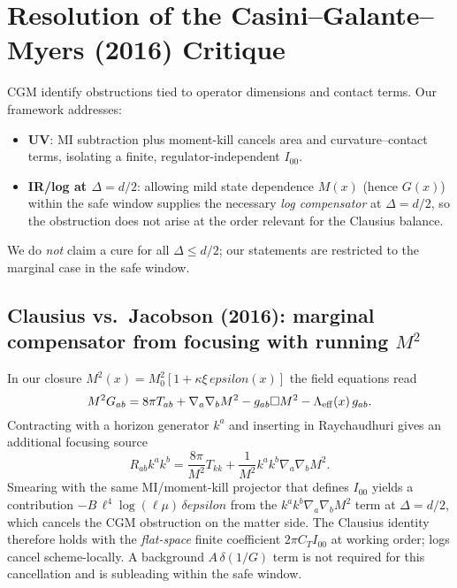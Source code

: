 \documentclass[aps,prd,onecolumn,superscriptaddress,nofootinbib]{revtex4-2}
\def\eps{epsilon}%
\newcommand{\eps}{\varepsilon}
\begin{document}
\section{Resolution of the Casini--Galante--Myers (2016) Critique}
\label{sec:CGM}
CGM identify obstructions tied to operator dimensions and contact terms. Our framework addresses:
\begin{itemize}[leftmargin=1.3em]
\item \textbf{UV}: MI subtraction plus moment-kill cancels area and curvature--contact terms, isolating a finite, regulator-independent $I_{00}$.
\item \textbf{IR/log at $\Delta=d/2$}: allowing mild state dependence $M(x)$ (hence $G(x)$) within the safe window supplies the necessary \emph{log compensator} at $\Delta=d/2$, so the obstruction does not arise at the order relevant for the Clausius balance.
\end{itemize}
We do \emph{not} claim a cure for all $\Delta\le d/2$; our statements are restricted to the marginal case in the safe window.

\subsection{Clausius vs.\ Jacobson (2016): marginal compensator from focusing with running \texorpdfstring{$M^2$}{M2}}
\label{sec:clausius-vs-jacobson}
In our closure \(M^2(x)=M_0^2[1+\kappa\xi\,\eps(x)]\) the field equations read
\begin{equation}
\label{eq:eom-jordan-2}
M^2 G_{ab}=8\pi T_{ab}+\nabla_a\nabla_b M^2-g_{ab}\Box M^2-\Lambda_{\rm eff}(x)\,g_{ab}.
\end{equation}
Contracting with a horizon generator \(k^a\) and inserting in Raychaudhuri gives an additional focusing source
\begin{equation}
\label{eq:focusing-source}
R_{ab}k^a k^b=\frac{8\pi}{M^2}T_{kk}+\frac{1}{M^2}k^a k^b\nabla_a\nabla_b M^2.
\end{equation}
Smearing with the same MI/moment-kill projector that defines \(I_{00}\) yields a contribution \(-B\,\ell^4\log(\ell\mu)\,\delta\eps\) from the \(k^a k^b\nabla_a\nabla_b M^2\) term at \(\Delta=d/2\), which cancels the CGM obstruction on the matter side. The Clausius identity therefore holds with the \emph{flat-space} finite coefficient \(2\pi C_T I_{00}\) at working order; logs cancel scheme-locally. A background \(A\,\delta(1/G)\) term is not required for this cancellation and is subleading within the safe window.
\end{document}
